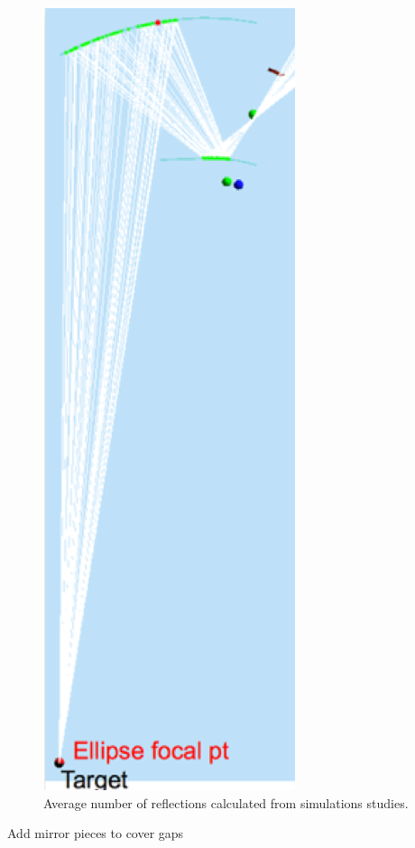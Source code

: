 \begin{figure}[h]
\centering
	\includegraphics[width=1.0\columnwidth, height=0.5\textheight]{img/mirrorAlignmentSimulation.png}
	\caption{Average number of reflections calculated from simulations studies.}
	\label{fig:alignmentSimulation}
\end{figure}



Add mirror pieces to cover gaps
